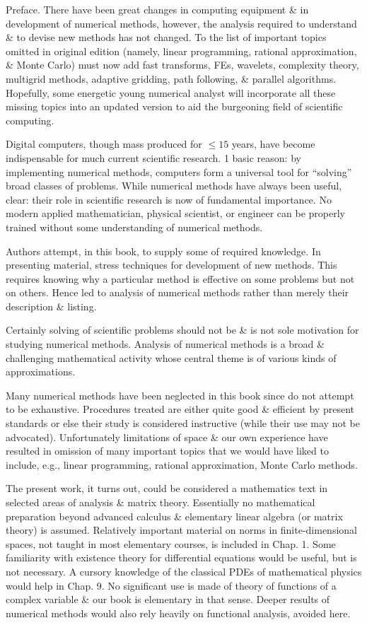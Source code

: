 \documentclass{article}
\begin{document}
	
\begin{itemize}
	{\sf Preface.} There have been great changes in computing equipment \& in development of numerical methods, however, the analysis required to understand \& to devise new methods has not changed. To the list of important topics omitted in original edition (namely, linear programming, rational approximation, \& Monte Carlo) must now add fast transforms, FEs, wavelets, complexity theory, multigrid methods, adaptive gridding, path following, \& parallel algorithms. Hopefully, some energetic young numerical analyst will incorporate all these missing topics into an updated version to aid the burgeoning field of scientific computing.
	
	Digital computers, though mass produced for $\le15$ years, have become indispensable for much current scientific research. 1 basic reason: by implementing numerical methods, computers form a universal tool for ``solving'' broad classes of problems. While numerical methods have always been useful, clear: their role in scientific research is now of fundamental importance. No modern applied mathematician, physical scientist, or engineer can be properly trained without some understanding of numerical methods.
	
	Authors attempt, in this book, to supply some of required knowledge. In presenting material, stress techniques for development of new methods. This requires knowing why a particular method is effective on some problems but not on others. Hence led to analysis of numerical methods rather than merely their description \& listing.
	
	Certainly solving of scientific problems should not be \& is not sole motivation for studying numerical methods. Analysis of numerical methods is a broad \& challenging mathematical activity whose central theme is  of various kinds of approximations.
	
	Many numerical methods have been neglected in this book since do not attempt to be exhaustive. Procedures treated are either quite good \& efficient by present standards or else their study is considered instructive (while their use may not be advocated). Unfortunately limitations of space \& our own experience have resulted in omission of many important topics that we would have liked to include, e.g., linear programming, rational approximation, Monte Carlo methods.
	
	The present work, it turns out, could be considered a mathematics text in selected areas of analysis \& matrix theory. Essentially no mathematical preparation beyond advanced calculus \& elementary linear algebra (or matrix theory) is assumed. Relatively important material on norms in finite-dimensional spaces, not taught in most elementary courses, is included in Chap. 1. Some familiarity with existence theory for differential equations would be useful, but is not necessary. A cursory knowledge of the classical PDEs of mathematical physics would help in Chap. 9. No significant use is made of theory of functions of a complex variable \& our book is elementary in that sense. Deeper results of numerical methods would also rely heavily on functional analysis, avoided here.
	

\end{itemize}
\end{document}
